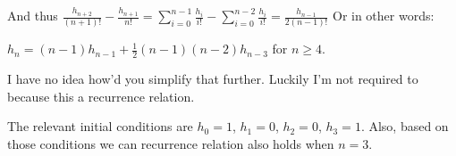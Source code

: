 \documentclass{book}
\newenvironment{myIndent}{%
   \begin{adjustwidth}{2.5em}{0em}%
}{%
   \end{adjustwidth}%
}
\newcommand{\retTwo}{\hfill\bigbreak}
\begin{document}
\begin{enumerate}
\begin{myIndent}
		And thus $\frac{h_{n+2}}{(n+1)!} - \frac{h_{n+1}}{n!} = \sum\limits_{i=0}^{n-1} \frac{h_i}{i!} - \sum\limits_{i=0}^{n-2} \frac{h_i}{i!} = \frac{h_{n-1}}{2(n-1)!}$ Or in other words:

		{\centering $h_n = (n-1)h_{n-1} + \frac{1}{2}(n-1)(n-2)h_{n-3}$ for $n \geq 4$.\retTwo\par}

		I have no idea how'd you simplify that further. Luckily I'm not required to because this a recurrence relation.\retTwo

		The relevant initial conditions are $h_0 = 1$, $h_1 = 0$, $h_2 = 0$, $h_3 = 1$. Also, based on those conditions we can recurrence relation also holds when $n = 3$.\retTwo
	\end{myIndent}
\end{enumerate}
\end{document}
